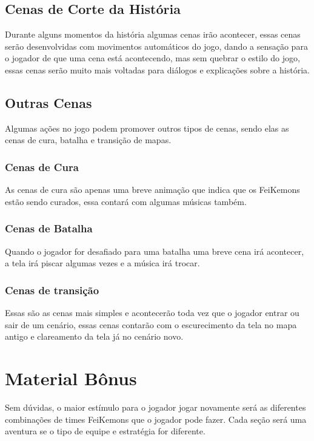 \documentclass[a4paper,12pt]{article}
\begin{document}
\subsection{Cenas de Corte da História}
Durante alguns momentos da história algumas cenas irão acontecer, essas cenas serão desenvolvidas com movimentos automáticos do jogo, dando a 
sensação para o jogador de que uma cena está acontecendo, mas sem quebrar o estilo do jogo, essas cenas serão muito mais voltadas para diálogos e 
explicações sobre a história.

\subsection{Outras Cenas}
Algumas ações no jogo podem promover outros tipos de cenas, sendo elas as cenas de cura, batalha e transição de mapas.

\subsubsection{Cenas de Cura}
As cenas de cura são apenas uma breve animação que indica que os FeiKemons estão sendo curados, essa contará com algumas músicas também.

\subsubsection{Cenas de Batalha}
Quando o jogador for desafiado para uma batalha uma breve cena irá acontecer, a tela irá piscar algumas vezes e a música irá trocar.

\subsubsection{Cenas de transição}
Essas são as cenas mais simples e acontecerão toda vez que o jogador entrar ou sair de um cenário, essas cenas contarão com o escurecimento 
da tela no mapa antigo e clareamento da tela já no cenário novo.

\newpage
\section{Material Bônus}
Sem dúvidas, o maior estímulo para o jogador jogar novamente será as diferentes combinações de times FeiKemons que o jogador pode fazer.
Cada seção será uma aventura se o tipo de equipe e estratégia for diferente.
\end{document}
